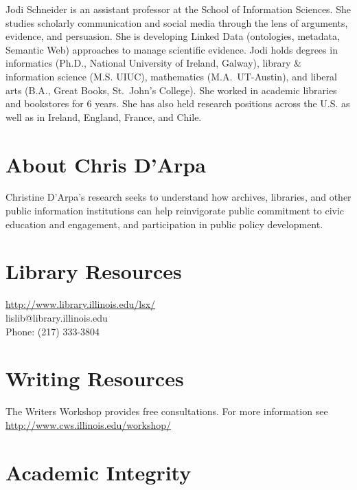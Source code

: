 \documentclass[]{article}
\begin{document}
Jodi Schneider is an assistant professor at the School of Information
Sciences. She studies scholarly communication and social media through
the lens of arguments, evidence, and persuasion. She is developing
Linked Data (ontologies, metadata, Semantic Web) approaches to manage
scientific evidence. Jodi holds degrees in informatics (Ph.D., National
University of Ireland, Galway), library \& information science (M.S.
UIUC), mathematics (M.A.~UT-Austin), and liberal arts (B.A., Great
Books, St.~John's College). She worked in academic libraries and
bookstores for 6 years. She has also held research positions across the
U.S. as well as in Ireland, England, France, and Chile.

\section{About Chris D'Arpa}\label{about-chris-darpa}

Christine D'Arpa's research seeks to understand how archives, libraries,
and other public information institutions can help reinvigorate public
commitment to civic education and engagement, and participation in
public policy development.

\section{Library Resources}\label{library-resources}

\url{http://www.library.illinois.edu/lsx/}\\
lislib@library.illinois.edu\\
Phone: (217) 333-3804

\section{Writing Resources}\label{writing-resources}

The Writers Workshop provides free consultations. For more information
see \url{http://www.cws.illinois.edu/workshop/}

\section{Academic Integrity}\label{academic-integrity}
\end{document}
